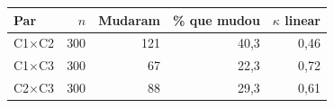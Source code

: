 \begin{tabular}{lrrrr}
\hline
Par & $n$ & Mudaram & \% que mudou & $\kappa$ linear \\ \hline
C1$\times$C2 & 300 & 121 & 40{,}3 & 0{,}46 \\
C1$\times$C3 & 300 & 67 & 22{,}3 & 0{,}72 \\
C2$\times$C3 & 300 & 88 & 29{,}3 & 0{,}61 \\
\hline
\end{tabular}
